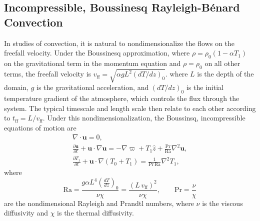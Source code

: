 \documentclass[aps, pre, onecolumn, nofootinbib, notitlepage, groupedaddress, amsfonts, amssymb, amsmath, longbibliography]{revtex4-1}
\newcommand{\DivU}{\ensuremath{\nabla\cdot\bm{u}}}
\newcommand{\grad}{\ensuremath{\nabla}}
\newcommand{\RB}{Rayleigh-B\'{e}nard }
\begin{document}
\subsection{Incompressible, Boussinesq \RB Convection}
In studies of convection, it is natural to nondimensionalize the flows on the freefall velocity.
Under the Boussinesq approximation, where $\rho = \rho_0 (1 - \alpha T_1)$ on the gravitational term in the momentum
equation and $\rho = \rho_0$ on all other terms, the freefall velocity is $v_{\text{ff}} = \sqrt{\alpha g L^2 (dT/dz)_0}$.
where $L$ is the depth of the domain, $g$ is the gravitational acceleration, and $(dT/dz)_0$ is the initial temperature
gradient of the atmosphere, which controls the flux through the system.  The typical timescale and length scale
then relate to each other according to $t_{\text{ff}} = L/v_{\text{ff}}$.
Under this nondimensionalization, the Boussinsq, incompressible equations of motion are
\begin{gather}
\DivU = 0, 
	\label{eqn:incompressible}
\\
\frac{\partial \bm{u}}{\partial t} + \bm{u}\cdot\grad\bm{u} =
-\grad\varpi + T_1\hat{z} + \frac{\text{Pr}}{\text{Ra}}\grad^2\bm{u}, 
	\label{eqn:bouss_momentum_eqn}
\\
\frac{\partial T_1}{\partial t} + \bm{u}\cdot\grad(T_0 + T_1) = \frac{1}{\text{Pr}\,\text{Ra}}\grad^2 T_1,
	\label{eqn:bouss_energy_eqn}
\end{gather}
where
\begin{equation}
\text{Ra} = \frac{g \alpha L^4 \left(\frac{dT}{dz}\right)_0}{\nu\chi} = \frac{(L\,v_{\text{ff}})^2}{\nu\chi}, \qquad \text{Pr} = \frac{\nu}{\chi}
\end{equation}
are the nondimensional Rayleigh and Prandtl numbers, where $\nu$ is the viscous diffusivity and $\chi$ is
the thermal diffusivity.
\end{document}
